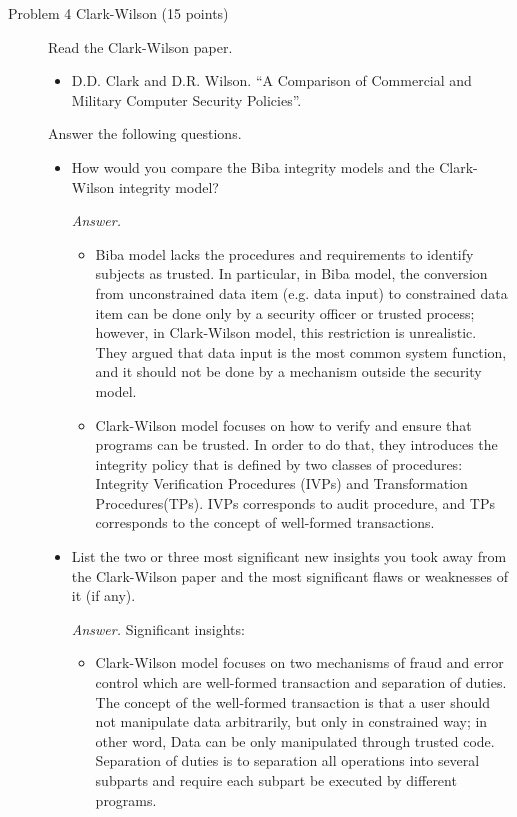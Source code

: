 \documentclass[11pt]{article}
\begin{document}
\begin{description}
 \item[Problem 4 Clark-Wilson (15 points)]
Read the Clark-Wilson paper.

\begin{itemize}
 \item
D.D. Clark and D.R. Wilson. ``A Comparison of Commercial and Military Computer Security Policies''.
\end{itemize}

Answer the following questions.
{\bf
\begin{itemize}
 \item
How would you compare the Biba integrity models and the Clark-Wilson integrity model?
\begin{mdframed}
	\textit{Answer. }
	\begin{itemize}
		\item Biba model lacks the procedures and requirements to identify subjects as trusted. In particular, in Biba model, the conversion from unconstrained data item (e.g. data input) to constrained data item can be done only by a security officer or trusted process; however, in Clark-Wilson model, this restriction is unrealistic. They argued that data input is the most common system function, and it should not be done by a mechanism outside the security model. 

		\item Clark-Wilson model focuses on how to verify and ensure that programs can be trusted. In order to do that, they introduces the integrity policy that is defined by two classes of procedures: Integrity Verification Procedures (IVPs) and Transformation Procedures(TPs). IVPs corresponds to audit procedure, and TPs corresponds to the concept of well-formed transactions. 
	\end{itemize}
\end{mdframed}
 \item
List the two or three most significant new insights you took away from the
Clark-Wilson paper and the most significant flaws or weaknesses of it (if any).\\
\begin{mdframed}
	\textit{Answer. } Significant insights: 
	\begin{itemize}
		\item Clark-Wilson model focuses on two mechanisms of fraud and error control which are well-formed transaction and separation of duties. The concept of the well-formed transaction is that a user should not manipulate data arbitrarily, but only in constrained way; in other word, Data can be only manipulated through trusted code. Separation of duties is to separation all operations into several subparts and require each subpart be executed by different programs.


\end{itemize}
\end{mdframed}
\end{itemize}}
\end{description}
\end{document}
